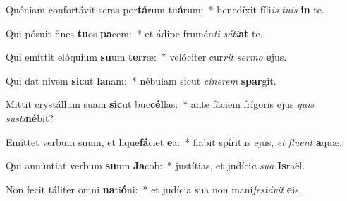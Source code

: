 \item Quóniam confortávit seras por\textbf{tá}rum tu\textbf{á}rum:~* benedíxit fíli\textit{is} \textit{tu}\textit{is} \textbf{in} te.
\item Qui pósuit fines \textbf{tu}os \textbf{pa}cem:~* et ádipe frumén\textit{ti} \textit{sá}\textit{ti}\textbf{at} te.
\item Qui emíttit elóquium \textbf{su}um \textbf{ter}ræ:~* velóciter cur\textit{rit} \textit{ser}\textit{mo} \textbf{e}jus.
\item Qui dat nivem \textbf{sic}ut \textbf{la}nam:~* nébulam sicut \textit{cí}\textit{ne}\textit{rem} \textbf{spar}git.
\item Mittit crystállum suam \textbf{sic}ut buc\textbf{cél}las:~* ante fáciem frígoris ejus \textit{quis} \textit{sus}\textit{ti}\textbf{né}bit?
\item Emíttet verbum suum, et lique\textbf{fá}ciet \textbf{e}a:~* flabit spíritus ejus, \textit{et} \textit{flu}\textit{ent} \textbf{a}quæ.
\item Qui annúntiat verbum \textbf{su}um \textbf{Ja}cob:~* justítias, et judíci\textit{a} \textit{su}\textit{a} \textbf{Is}raël.
\item Non fecit táliter omni \textbf{na}ti\textbf{ó}ni:~* et judícia sua non mani\textit{fes}\textit{tá}\textit{vit} \textbf{e}is.
